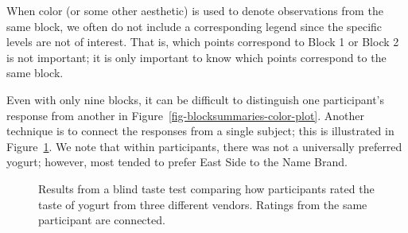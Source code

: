 \documentclass[
  letterpaper,
  DIV=11,
  numbers=noendperiod]{scrreprt}
\theoremstyle{plain}
\theoremstyle{definition}
\theoremstyle{definition}
\theoremstyle{remark}
\begin{document}
\begin{tcolorbox}[enhanced jigsaw, breakable, titlerule=0mm, colframe=quarto-callout-note-color-frame, bottomtitle=1mm, opacityback=0, rightrule=.15mm, toptitle=1mm, arc=.35mm, bottomrule=.15mm, left=2mm, title=\textcolor{quarto-callout-note-color}{\faInfo}\hspace{0.5em}{Note}, leftrule=.75mm, coltitle=black, toprule=.15mm, colbacktitle=quarto-callout-note-color!10!white, colback=white, opacitybacktitle=0.6]

When color (or some other aesthetic) is used to denote observations from
the same block, we often do not include a corresponding legend since the
specific levels are not of interest. That is, which points correspond to
Block 1 or Block 2 is not important; it is only important to know which
points correspond to the same block.

\end{tcolorbox}

Even with only nine blocks, it can be difficult to distinguish one
participant's response from another in
Figure~\ref{fig-blocksummaries-color-plot}. Another technique is to
connect the responses from a single subject; this is illustrated in
Figure~\ref{fig-blocksummaries-line-plot}. We note that within
participants, there was not a universally preferred yogurt; however,
most tended to prefer East Side to the Name Brand.

\begin{figure}


\caption{\label{fig-blocksummaries-line-plot}Results from a blind taste
test comparing how participants rated the taste of yogurt from three
different vendors. Ratings from the same participant are connected.}

\end{figure}%
\end{document}
